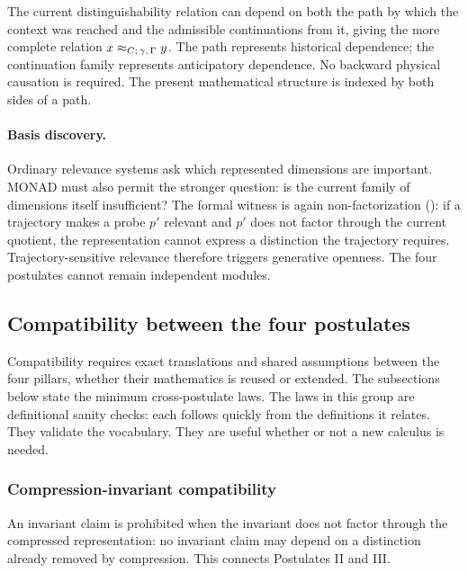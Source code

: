 The current distinguishability relation can depend on both the path by
which the context was reached and the admissible continuations from
it, giving the more complete relation
$x \approx_{C;\,\gamma,\,\Gamma} y$. The path represents historical
dependence; the continuation family represents anticipatory
dependence. No backward physical causation is required. The present
mathematical structure is indexed by both sides of a path.

\paragraph{Basis discovery.}

Ordinary relevance systems ask which represented dimensions are
important. MONAD must also permit the stronger question: is the
current family of dimensions itself insufficient? The formal witness
is again non-factorization (): if a
trajectory makes a probe $p'$ relevant and $p'$ does not factor
through the current quotient, the representation cannot express a
distinction the trajectory requires.
Trajectory-sensitive relevance therefore triggers generative openness.
The four postulates cannot remain independent modules.

\subsection{Compatibility between the four postulates}

Compatibility requires exact translations and shared assumptions between
the four pillars, whether their mathematics is reused or extended.
The subsections below state the minimum cross-postulate laws. The laws
in this group are definitional sanity checks: each follows quickly
from the definitions it relates. They validate the vocabulary. They
are useful whether or not a new calculus is needed.







\subsubsection{Compression-invariant compatibility}
An invariant claim is prohibited when the invariant does not factor
through the compressed representation: no invariant claim may depend
on a distinction already removed by compression. This connects
Postulates II and III\@.

